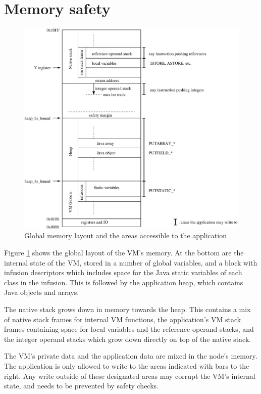 \section{Memory safety}

\begin{figure}
\includegraphics[width=\linewidth]{memlayout.eps}
\caption{Global memory layout and the areas accessible to the application}
\label{fig-memlayout}
\end{figure}

Figure \ref{fig-memlayout} shows the global layout of the VM's memory. At the bottom are the internal state of the VM, stored in a number of global variables, and a block with infusion descriptors which includes space for the Java static variables of each class in the infusion. This is followed by the application heap, which contains Java objects and arrays.

The native stack grows down in memory towards the heap. This contains a mix of native stack frames for internal VM functions, the application's VM stack frames containing space for local variables and the reference operand stacks, and the integer operand stacks which grow down directly on top of the native stack.

The VM's private data and the application data are mixed in the node's memory. The application is only allowed to write to the areas indicated with bars to the right. Any write outside of these designated areas may corrupt the VM's internal state, and needs to be prevented by safety checks.

